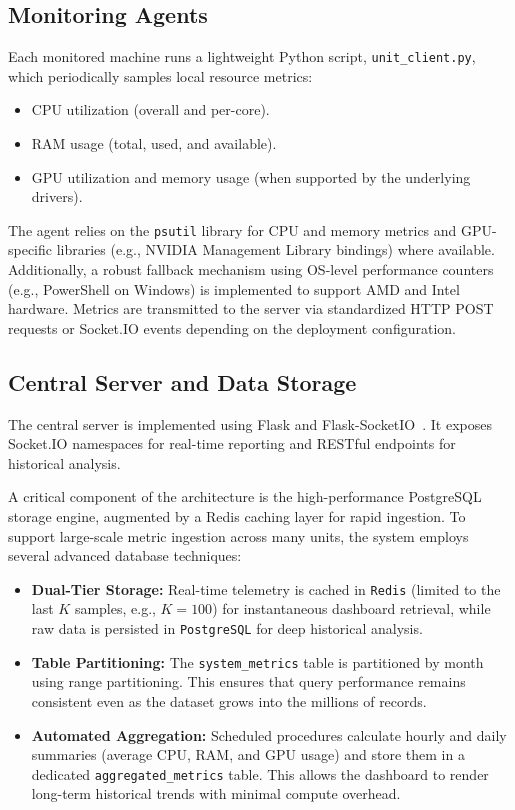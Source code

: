 \documentclass[conference]{IEEEtran}
\begin{document}
\subsection{Monitoring Agents}

Each monitored machine runs a lightweight Python script, \texttt{unit\_client.py}, which periodically samples local resource metrics:
\begin{itemize}
  \item CPU utilization (overall and per-core).
  \item RAM usage (total, used, and available).
  \item GPU utilization and memory usage (when supported by the underlying drivers).
\end{itemize}
The agent relies on the \texttt{psutil} library for CPU and memory metrics and GPU-specific libraries (e.g., NVIDIA Management Library bindings) where available. Additionally, a robust fallback mechanism using OS-level performance counters (e.g., PowerShell on Windows) is implemented to support AMD and Intel hardware. Metrics are transmitted to the server via standardized HTTP POST requests or Socket.IO events depending on the deployment configuration.

\subsection{Central Server and Data Storage}

The central server is implemented using Flask and Flask-SocketIO~\cite{flaskSocketIO}. It exposes Socket.IO namespaces for real-time reporting and RESTful endpoints for historical analysis. 

A critical component of the architecture is the high-performance PostgreSQL storage engine, augmented by a Redis caching layer for rapid ingestion. To support large-scale metric ingestion across many units, the system employs several advanced database techniques:
\begin{itemize}
  \item \textbf{Dual-Tier Storage:} Real-time telemetry is cached in \texttt{Redis} (limited to the last $K$ samples, e.g., $K=100$) for instantaneous dashboard retrieval, while raw data is persisted in \texttt{PostgreSQL} for deep historical analysis.
  \item \textbf{Table Partitioning:} The \texttt{system\_metrics} table is partitioned by month using range partitioning. This ensures that query performance remains consistent even as the dataset grows into the millions of records.
  \item \textbf{Automated Aggregation:} Scheduled procedures calculate hourly and daily summaries (average CPU, RAM, and GPU usage) and store them in a dedicated \texttt{aggregated\_metrics} table. This allows the dashboard to render long-term historical trends with minimal compute overhead.
\end{itemize}
\end{document}
